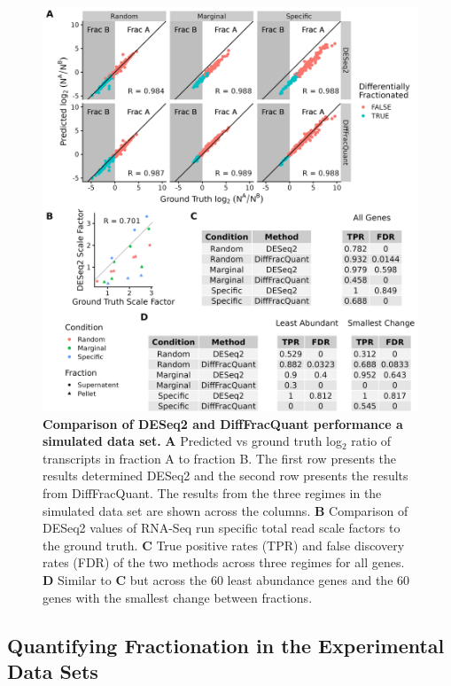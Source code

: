 \documentclass[../main.tex]{subfiles}
\begin{document}
\begin{figure}[p!]

{\centering \includegraphics[width=1\linewidth]{figures/DESeq_vs_bayesian_combined.png} 

}

\caption[Simulated data performance.]{\textbf{Comparison of DESeq2 and DiffFracQuant performance a simulated data set.} \textbf{A} Predicted vs ground truth log$_2$ ratio of transcripts in fraction A to fraction B. The first row presents the results determined DESeq2 and the second row presents the results from DiffFracQuant. The results from the three regimes in the simulated data set are shown across the columns. \textbf{B} Comparison of DESeq2 values of RNA-Seq run specific total read scale factors to the ground truth. \textbf{C} True positive rates (TPR) and false discovery rates (FDR) of the two methods across three regimes for all genes. \textbf{D} Similar to \textbf{C} but across the 60 least abundance genes and the 60 genes with the smallest change between fractions.} \label{fig:simulated-data-results}
\end{figure}

\subsection{Quantifying Fractionation in the Experimental Data Sets}
\end{document}
